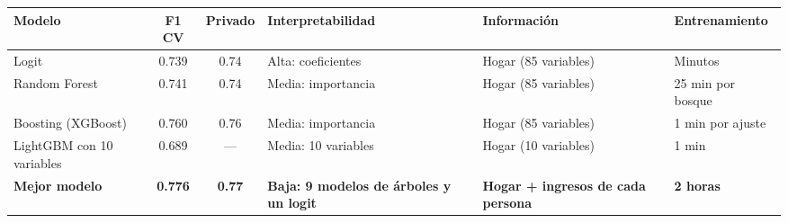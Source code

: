 
\begin{tabular}[t]{lcclll}
\toprule
Modelo & F1 CV & Privado & Interpretabilidad & Información & Entrenamiento\\
\midrule
Logit & 0.739 & 0.74 & Alta: coeficientes & Hogar (85 variables) & Minutos\\
Random Forest & 0.741 & 0.74 & Media: importancia & Hogar (85 variables) & 25 min por bosque\\
Boosting (XGBoost) & 0.760 & 0.76 & Media: importancia & Hogar (85 variables) & 1 min por ajuste\\
LightGBM con 10 variables & 0.689 & --- & Media: 10 variables & Hogar (10 variables) & 1 min\\
\textbf{Mejor modelo} & \textbf{0.776} & \textbf{0.77} & \textbf{Baja: 9 modelos de árboles y un logit} & \textbf{Hogar + ingresos de cada persona} & \textbf{2 horas}\\
\bottomrule
\end{tabular}
